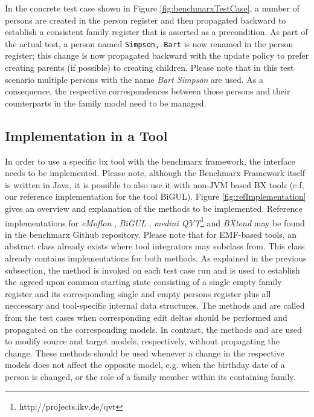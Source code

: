 In the concrete test case shown in Figure \ref{fig:benchmarxTestCase}, a number of persons are created in the person register and then propagated backward to establish a consistent family register that is asserted as a precondition. As part of the actual test, a person named \texttt{Simpson, Bart} is now renamed in the person register; this change is now propagated backward with the update policy to prefer creating parents (if possible) to creating children. Please note that in this test scenario multiple persons with the name \emph{Bart Simpson} are used. As a consequence, the respective correspondences between those persons and their counterparts in the family model need to be managed.

\subsection{Implementation in a Tool}

In order to use a specific bx tool with the benchmarx framework, the interface  needs to be implemented. Please note, although the Benchmarx Framework itself is written in Java, it is possible to also use it with non-JVM based BX tools (c.f, our reference implementation for the tool BiGUL). Figure \ref{fig:refImplementation} gives an overview and explanation of the methods to be implemented. Reference implementations for \emph{eMoflon} \cite{}, \emph{BiGUL} \cite{}, \emph{medini QVT}\footnote{http://projects.ikv.de/qvt} and \emph{BXtend} \cite{MODELSWARD2018-Buchmann} may be found in the benchmarx Github repository. Please note that for EMF-based tools, an abstract class  already exists where tool integrators may subclass from. This class already contains implementations for both  methods. As explained in the previous subsection, the method  is invoked on each test case run and is used to establish the agreed upon common starting state consisting of a single empty family register and its corresponding single and empty persons register plus all neccessary and tool-specific internal data structures. The methods  and   are called from the test cases when corresponding edit deltas should be performed and propagated on the corresponding models. In contrast, the methods  and  are used to modify source and target models, respectively, without propagating the change. These methods should be used whenever a change in the respective models does not affect the opposite model, e.g. when the birthday date of a person is changed, or the role of a family member within its containing family.

